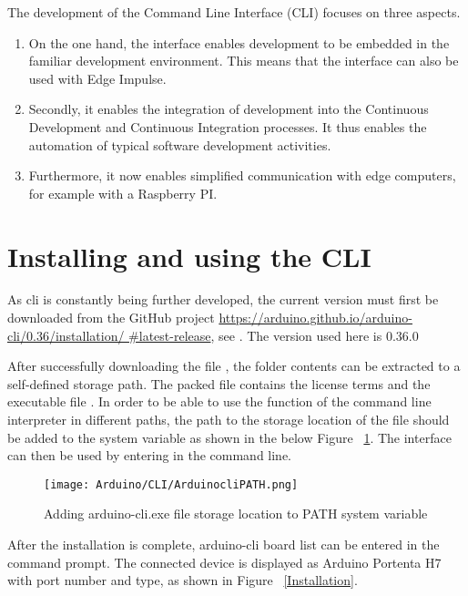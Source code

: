 The development of the Command Line Interface (CLI) focuses on three aspects.
\begin{enumerate}
    \item On the one hand, the interface enables development to be embedded in the familiar development environment. This means that the interface can also be used with Edge Impulse.
    \item Secondly, it enables the integration of development into the Continuous Development and Continuous Integration processes. It thus enables the automation of typical software development activities.
    \item Furthermore, it now enables simplified communication with edge computers, for example with a Raspberry PI.
\end{enumerate}

\section {Installing and using the CLI}
As \ac{cli} is constantly being further developed, the current version must first be downloaded from the GitHub project \url{https://arduino.github.io/arduino-cli/0.36/installation/ #latest-release}, see \cite{ArduinoCLIGit:2024}. The version used here is 0.36.0 \cite{ArduinoCLI:2024}

\bigskip

After successfully downloading the file , the folder contents can be extracted to a self-defined storage path. The packed file contains the license terms and the executable file . In order to be able to use the function of the command line interpreter in different paths, the path to the storage location of the  file should be added to the  system variable as shown in the below Figure ~\ref{Path}. The interface can then be used by entering  in the command line.

\begin{figure}
    \begin{center}
        \texttt{[image: Arduino/CLI/ArduinocliPATH.png]}
        \caption{Adding arduino-cli.exe file storage location to PATH system variable}
        \label{Path}
    \end{center}
\end{figure}


After the installation is complete, arduino-cli board list can be entered in the command prompt. The connected device is displayed as Arduino Portenta H7 with port number and type, as shown in Figure ~\ref{Installation}.  

